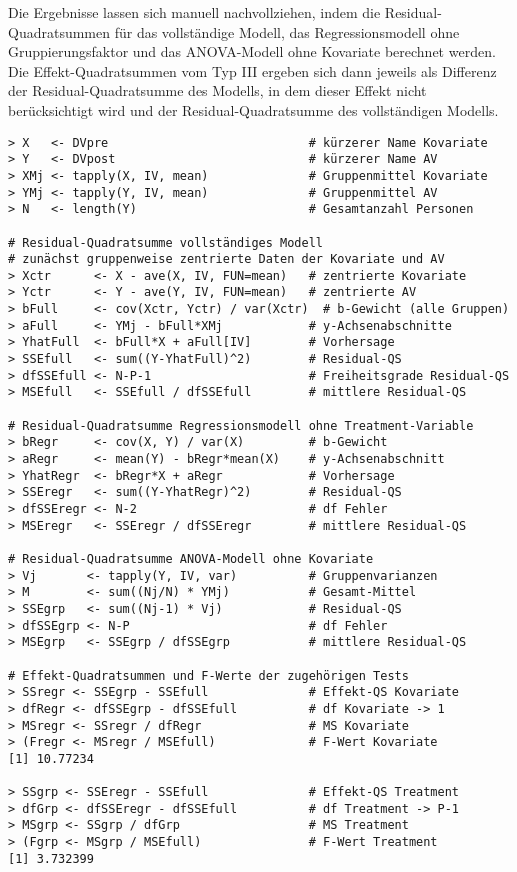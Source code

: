 Die Ergebnisse lassen sich manuell nachvollziehen, indem die Residual-Quadratsummen für das vollständige Modell, das Regressionsmodell ohne Gruppierungsfaktor und das ANOVA-Modell ohne Kovariate berechnet werden. Die Effekt-Quadratsummen vom Typ III ergeben sich dann jeweils als Differenz der Residual-Quadratsumme des Modells, in dem dieser Effekt nicht berücksichtigt wird und der Residual-Quadratsumme des vollständigen Modells.
\begin{lstlisting}
> X   <- DVpre                            # kürzerer Name Kovariate
> Y   <- DVpost                           # kürzerer Name AV
> XMj <- tapply(X, IV, mean)              # Gruppenmittel Kovariate
> YMj <- tapply(Y, IV, mean)              # Gruppenmittel AV
> N   <- length(Y)                        # Gesamtanzahl Personen

# Residual-Quadratsumme vollständiges Modell
# zunächst gruppenweise zentrierte Daten der Kovariate und AV
> Xctr      <- X - ave(X, IV, FUN=mean)   # zentrierte Kovariate
> Yctr      <- Y - ave(Y, IV, FUN=mean)   # zentrierte AV
> bFull     <- cov(Xctr, Yctr) / var(Xctr)  # b-Gewicht (alle Gruppen)
> aFull     <- YMj - bFull*XMj            # y-Achsenabschnitte
> YhatFull  <- bFull*X + aFull[IV]        # Vorhersage
> SSEfull   <- sum((Y-YhatFull)^2)        # Residual-QS
> dfSSEfull <- N-P-1                      # Freiheitsgrade Residual-QS
> MSEfull   <- SSEfull / dfSSEfull        # mittlere Residual-QS

# Residual-Quadratsumme Regressionsmodell ohne Treatment-Variable
> bRegr     <- cov(X, Y) / var(X)         # b-Gewicht
> aRegr     <- mean(Y) - bRegr*mean(X)    # y-Achsenabschnitt
> YhatRegr  <- bRegr*X + aRegr            # Vorhersage
> SSEregr   <- sum((Y-YhatRegr)^2)        # Residual-QS
> dfSSEregr <- N-2                        # df Fehler
> MSEregr   <- SSEregr / dfSSEregr        # mittlere Residual-QS

# Residual-Quadratsumme ANOVA-Modell ohne Kovariate
> Vj       <- tapply(Y, IV, var)          # Gruppenvarianzen
> M        <- sum((Nj/N) * YMj)           # Gesamt-Mittel
> SSEgrp   <- sum((Nj-1) * Vj)            # Residual-QS
> dfSSEgrp <- N-P                         # df Fehler
> MSEgrp   <- SSEgrp / dfSSEgrp           # mittlere Residual-QS

# Effekt-Quadratsummen und F-Werte der zugehörigen Tests
> SSregr <- SSEgrp - SSEfull              # Effekt-QS Kovariate
> dfRegr <- dfSSEgrp - dfSSEfull          # df Kovariate -> 1
> MSregr <- SSregr / dfRegr               # MS Kovariate
> (Fregr <- MSregr / MSEfull)             # F-Wert Kovariate
[1] 10.77234

> SSgrp <- SSEregr - SSEfull              # Effekt-QS Treatment
> dfGrp <- dfSSEregr - dfSSEfull          # df Treatment -> P-1
> MSgrp <- SSgrp / dfGrp                  # MS Treatment
> (Fgrp <- MSgrp / MSEfull)               # F-Wert Treatment
[1] 3.732399
\end{lstlisting}

